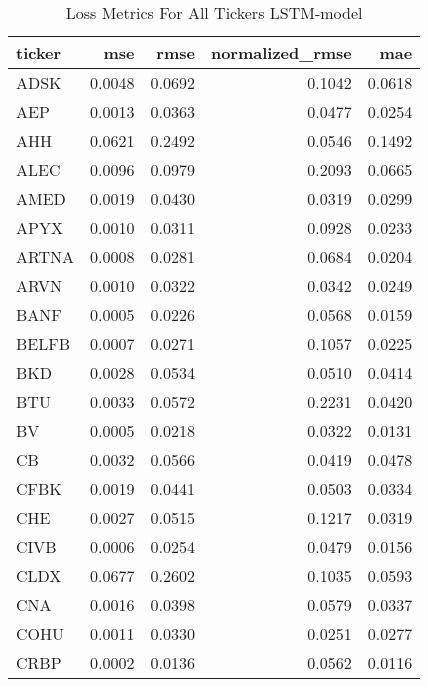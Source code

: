 \begin{table}
\caption{Loss Metrics For All Tickers LSTM-model}
\label{tab:loss_total_lstm}
\begin{tabular}{lrrrr}
\toprule
ticker & mse & rmse & normalized_rmse & mae \\
\midrule
ADSK & 0.0048 & 0.0692 & 0.1042 & 0.0618 \\
AEP & 0.0013 & 0.0363 & 0.0477 & 0.0254 \\
AHH & 0.0621 & 0.2492 & 0.0546 & 0.1492 \\
ALEC & 0.0096 & 0.0979 & 0.2093 & 0.0665 \\
AMED & 0.0019 & 0.0430 & 0.0319 & 0.0299 \\
APYX & 0.0010 & 0.0311 & 0.0928 & 0.0233 \\
ARTNA & 0.0008 & 0.0281 & 0.0684 & 0.0204 \\
ARVN & 0.0010 & 0.0322 & 0.0342 & 0.0249 \\
BANF & 0.0005 & 0.0226 & 0.0568 & 0.0159 \\
BELFB & 0.0007 & 0.0271 & 0.1057 & 0.0225 \\
BKD & 0.0028 & 0.0534 & 0.0510 & 0.0414 \\
BTU & 0.0033 & 0.0572 & 0.2231 & 0.0420 \\
BV & 0.0005 & 0.0218 & 0.0322 & 0.0131 \\
CB & 0.0032 & 0.0566 & 0.0419 & 0.0478 \\
CFBK & 0.0019 & 0.0441 & 0.0503 & 0.0334 \\
CHE & 0.0027 & 0.0515 & 0.1217 & 0.0319 \\
CIVB & 0.0006 & 0.0254 & 0.0479 & 0.0156 \\
CLDX & 0.0677 & 0.2602 & 0.1035 & 0.0593 \\
CNA & 0.0016 & 0.0398 & 0.0579 & 0.0337 \\
COHU & 0.0011 & 0.0330 & 0.0251 & 0.0277 \\
CRBP & 0.0002 & 0.0136 & 0.0562 & 0.0116 \\
\bottomrule
\end{tabular}
\end{table}
